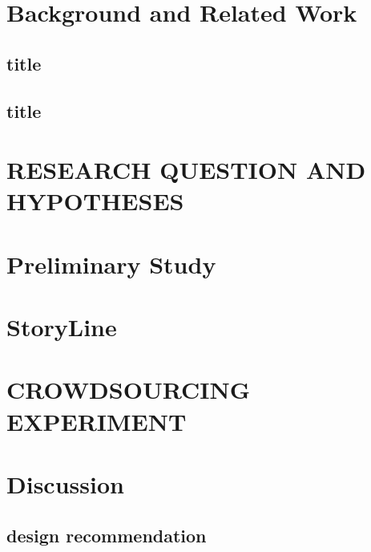 \documentclass[manuscript,screen,review]{acmart}
\begin{document}
\section{Background and Related Work}

\subsection{title}

\subsection{title}

\section{RESEARCH QUESTION AND HYPOTHESES}

% 
\section{Preliminary Study}

\section{StoryLine}

\section{CROWDSOURCING EXPERIMENT}




\section{Discussion}

\subsection{design recommendation}

\end{document}
